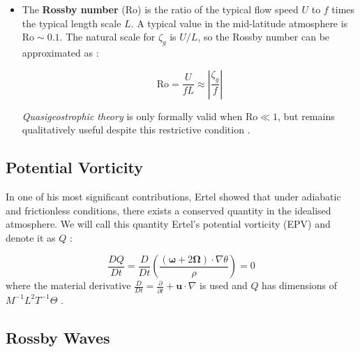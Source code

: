 \documentclass{article}
\begin{document}
\begin{itemize}
    \begin{equation}\label{geostrophic_vorticity}
        \zeta_g = \bm{\hat k} \cdot \bm{\omega_g} = \frac{\partial v_g}{\partial x} - \frac{\partial u_g}{\partial y} = \frac{\partial ^2 \psi_g}{\partial x^2} + \frac{\partial ^2 \psi_g}{\partial y^2} 
    \end{equation}

    \item The \textbf{Rossby number} ($\mathrm{Ro}$) is the ratio of the typical flow speed $U$ to $f$ times the typical length scale $L$.
    A typical value in the mid-latitude atmosphere is $\mathrm{Ro} \sim 0.1$.
    The natural scale for $\zeta_g$ is $U/L$, so the Rossby number can be approximated as \cite{HOLTON_chapter6,Vallis2017}:

    \begin{equation}\label{rossby_number}
        \mathrm{Ro} = \frac{U}{fL} \approx \left| \frac{\zeta_g}{f}\right|
    \end{equation}

    \textit{Quasigeostrophic theory} is only formally valid when $\mathrm{Ro} \ll 1$, but remains qualitatively useful despite this restrictive condition \cite{HOLTON_chapter6}.
    
\end{itemize}

\subsection{Potential Vorticity}
In one of his most significant contributions, Ertel showed that under adiabatic and frictionless conditions, there exists a conserved quantity in the idealised atmosphere.
We will call this quantity Ertel's potential vorticity (EPV) and denote it as $Q$ \cite{fehlmann1997pvelements,ertel_english}:

\begin{equation}\label{epv}
    \frac{DQ}{Dt} = \frac{D}{Dt} \left( \frac{(\bm{\omega} + 2 \bm{\Omega}) \cdot \nabla \theta}{\rho} \right) =0
\end{equation}
where the material derivative $\frac{D}{Dt} = \frac{\partial}{\partial t} + \mathbf{u} \cdot \nabla$ is used and $Q$ has dimensions of $M^{-1} L^2 T^{-1} \Theta$ \cite{Barnes2022main}.

\subsection{Rossby Waves}\label{sec:rossby_waves}
\end{document}
